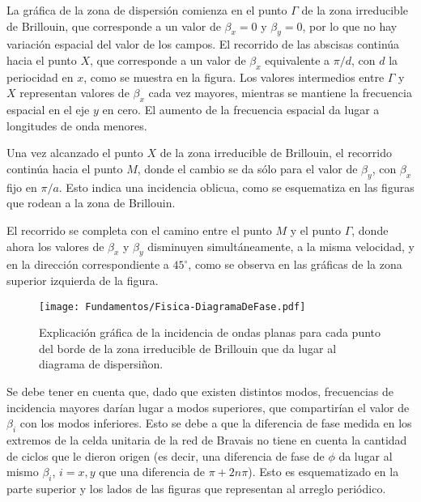 La gráfica de la zona de dispersión comienza en el punto $\Gamma$ de la zona irreducible de Brillouin, que corresponde a un valor de $\beta_x = 0$ y $\beta_y = 0$, por lo que no hay variación espacial del valor de los campos. El recorrido de las abscisas continúa hacia el punto $X$, que corresponde a un valor de $\beta_x$ equivalente a $\pi / d$, con $d$ la periocidad en $x$, como se muestra en la figura. Los valores intermedios entre $\Gamma$ y $X$ representan valores de $\beta_x$ cada vez mayores, mientras se mantiene la frecuencia espacial en el eje $y$ en cero. El aumento de la frecuencia espacial da lugar a longitudes de onda menores.

Una vez alcanzado el punto $X$ de la zona irreducible de Brillouin, el recorrido continúa hacia el punto $M$, donde el cambio se da sólo para el valor de $\beta_y$, con $\beta_x$ fijo en $\pi / a$. Esto indica una incidencia oblicua, como se esquematiza en las figuras que rodean a la zona de Brillouin.

El recorrido se completa con el camino entre el punto $M$ y el punto $\Gamma$, donde ahora los valores de $\beta_x$ y $\beta_y$ disminuyen simultáneamente, a la misma velocidad, y en la dirección correspondiente a $45^\circ$, como se observa en las gráficas de la zona superior izquierda de la figura.

\begin{figure}[h]
	\centering
	\texttt{[image: Fundamentos/Fisica-DiagramaDeFase.pdf]}
	\caption{Explicación gráfica de la incidencia de ondas planas para cada punto del borde de la zona irreducible de Brillouin que da lugar al diagrama de dispersiñon.}
	\label{fig:explicacion-zona-brillouin}
\end{figure}

Se debe tener en cuenta que, dado que existen distintos modos, frecuencias de incidencia mayores darían lugar a modos superiores, que compartirían el valor de $\beta_i$ con los modos inferiores. Esto se debe a que la diferencia de fase medida en los extremos de la celda unitaria de la red de Bravais no tiene en cuenta la cantidad de ciclos que le dieron origen (es decir, una diferencia de fase de $\phi$ da lugar al mismo $\beta_i$, $i=x,y$ que una diferencia de $\pi+2 n \pi$). Esto es esquematizado en la parte superior y los lados de las figuras que representan al arreglo periódico.

